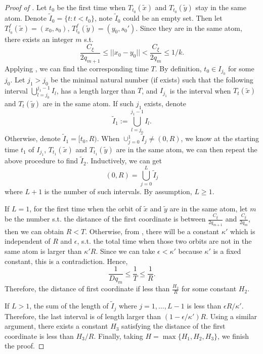 \documentclass[oneside]{amsart}
\theoremstyle{plain}
\theoremstyle{definition}
\newcommand{\<}{\langle}
\renewcommand{\>}{\rangle}
\newcommand{\e}{\epsilon}
\renewcommand{\|}{|\!|} %
\begin{document}
\begin{proof}[Proof of ]
Let $t_0$ be the first time when $T_{t_0}(\tilde{x})$ and $T_{t_0}(\tilde{y})$ stay in the same atom. Denote $\tilde{I}_0=\{t: t<t_0\}$, note $\tilde{I}_0$ could be an empty set.
Then let $T_{t_0}^f(\tilde{x})=(x_0,s_0)$, $T_{t_0}^f(\tilde{y})=(y_0,s_0')$. Since they are in the same atom, there exists an integer $m$ s.t. $$\frac{C_{\xi}}{2q_{m+1}}\leq \|x_0-y_0\|<\frac{C_{\xi}}{2q_m}\leq 1/k.$$ 
Applying , we can find the corresponding time $T$. By definition, $t_0\in I_{j_0}$ for some $j_0$. Let $j_1>j_0$ be the minimal natural number (if exists) such that the following interval $\displaystyle\bigcup_{l=j_0}^{j_1-1} I_{l}$,
has a length larger than $T$, and $I_{j_1}$ is the interval when $T_{t}(\tilde{x})$ and $T_{t}(\tilde{y})$ are in the same atom. If such $j_1$ exists, denote $$\tilde{I}_1:=\displaystyle\bigcup_{l=j_0}^{j_1-1} I_{l}.$$
Otherwise, denote $\tilde{I}_1=[t_0,R)$. When $\displaystyle \cup_{j=0}^{1} \tilde{I}_{j} \neq (0,R)$, we know at the starting time $t_1$ of $I_{j_1}$, $T_{t_1}(\tilde{x})$ and $T_{t_1}(\tilde{y})$ are in the same atom, we can then repeat the above procedure to find $\tilde{I}_2$.
  Inductively, we can get $$(0,R)=\displaystyle \bigcup_{j=0}^{L} \tilde{I}_{j}$$ where $L+1$ is the number of such intervals.
By assumption, \(L\geq 1.\) 

If $L=1$, for the first time when the orbit of $\tilde{x}$ and $\tilde{y}$ are in the same atom, let $m$ be the number s.t. the distance of the first coordinate is between $\frac{C_{\xi}}{2q_{m+1}}$ and $\frac{C_{\xi}}{2q_m}$, then we can obtain $R<T$. Otherwise, from , there will be a constant $\kappa'$ which is independent of $R$ and $\e$, s.t. the total time when those two orbits are not in the same atom is larger than $\kappa' R$. Since we can take $\e<\kappa'$ because $\kappa'$ is a fixed constant,  this is a contradiction. 
Hence, $$\frac{1}{D q_m}\leq\frac{1}{T}\leq \frac{1}{R}.$$
Therefore, the distance of first coordinate if less than \(\frac{H_2}{R}\) for some constant \(H_2.\)

If $L>1$, the sum of the length of $\tilde{I}_{j}$ where $j=1,\dots,L-1$ is less than $\e R/\kappa'$. Therefore, the last interval is of length larger than $(1-\e /\kappa') R$. Using a similar argument, there exists a constant $H_3$ satisfying 
the distance of the first coordinate is less than $H_3/R$.
Finally, taking $H=\max\{H_1,H_2,H_3\}$, we finish the proof.   
\end{proof}
\end{document}
